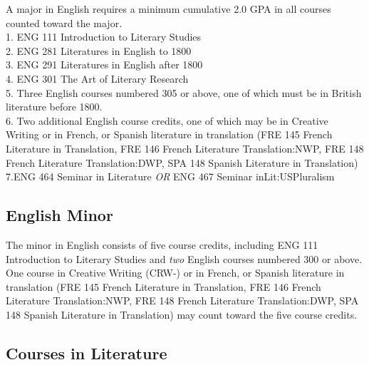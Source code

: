 \documentclass[
  letterpaper,
]{scrbook}
\begin{document}
A major in English requires a minimum cumulative 2.0 GPA in all courses
counted toward the major.\\
1. ENG 111 Introduction to Literary Studies\\
2. ENG 281 Literatures in English to 1800\\
3. ENG 291 Literatures in English after 1800\\
4. ENG 301 The Art of Literary Research\\
5. Three English courses numbered 305 or above, one of which must be in
British literature before 1800.\\
6. Two additional English course credits, one of which may be in
Creative Writing or in French, or Spanish literature in translation (FRE
145 French Literature in Translation, FRE 146 French Literature
Translation:NWP, FRE 148 French Literature Translation:DWP, SPA 148
Spanish Literature in Translation)\\
7.ENG 464 Seminar in Literature \emph{OR} ENG 467 Seminar
inLit:USPluralism

\subsection{English Minor}\label{english-minor}

The minor in English consists of five course credits, including ENG 111
Introduction to Literary Studies and \emph{two} English courses numbered
300 or above. One course in Creative Writing (CRW-) or in French, or
Spanish literature in translation (FRE 145 French Literature in
Translation, FRE 146 French Literature Translation:NWP, FRE 148 French
Literature Translation:DWP, SPA 148 Spanish Literature in Translation)
may count toward the five course credits.

\subsection{Courses in Literature}\label{sec-courses-in-english}
\end{document}
